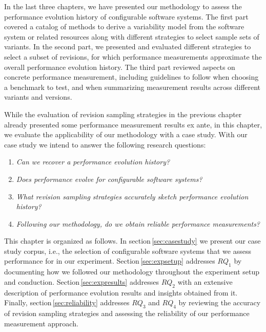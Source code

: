 In the last three chapters, we have presented our methodology to assess the
performance evolution history of configurable software systems. The first part
covered a catalog of methods to derive a variability model from the software
system or related resources along with different strategies to select sample
sets of variants. In the second part, we presented and evaluated different
strategies to select a subset of revisions, for which performance measurements
approximate the overall performance evolution history. The third part reviewed
aspects on concrete performance measurement, including guidelines to follow when choosing
a benchmark to test, and when summarizing measurement results across different
variants and versions.

While the evaluation of revision sampling strategies in the previous chapter
already presented some performance measurement results ex ante, in this chapter, we
evaluate the applicability of our methodology with a case study. With our case
study we intend to answer the following research questions:

\begin{enumerate}[$RQ_1$)]
  \item \emph{Can we recover a performance evolution history?}
  \item \emph{Does performance evolve for configurable software systems?}
  \item \emph{What revision sampling strategies accurately sketch performance evolution history?}
  \item \emph{Following our methodology, do we obtain reliable performance
  measurements?}
\end{enumerate}

This chapter is organized as follows. In section\,\ref{sec:casestudy} we present
our case study corpus, i.e., the selection of configurable software systems that we
assess performance for in our experiment. Section\,\ref{sec:expsetup} addresses
$RQ_1$ by documenting how we followed our methodology throughout the experiment
setup and conduction. Section\,\ref{sec:expresults} addresses $RQ_2$  with an
extensive description of performance evolution results and insights obtained from it.
Finally, section\,\ref{sec:reliability} addresses $RQ_3$ and $RQ_4$ by reviewing
the accuracy of revision sampling strategies and assessing the reliability of our performance measurement approach.

